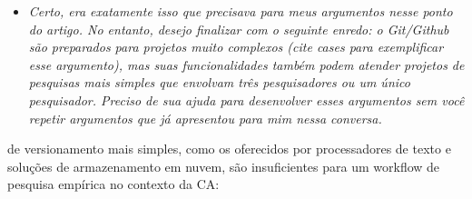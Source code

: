 \documentclass[
  a4paper,
]{article}
\providecommand{\tightlist}{%
  \setlength{\itemsep}{0pt}\setlength{\parskip}{0pt}}\usepackage{longtable,booktabs,array}
\begin{document}
{  \begin{itemize}
  \tightlist
  \item
    \emph{Certo, era exatamente isso que precisava para meus argumentos
    nesse ponto do artigo. No entanto, desejo finalizar com o seguinte
    enredo: o Git/Github são preparados para projetos muito complexos
    (cite cases para exemplificar esse argumento), mas suas
    funcionalidades também podem atender projetos de pesquisas mais
    simples que envolvam três pesquisadores ou um único pesquisador.
    Preciso de sua ajuda para desenvolver esses argumentos sem você
    repetir argumentos que já apresentou para mim nessa conversa.}
  \end{itemize}} de versionamento mais simples, como os oferecidos por
processadores de texto e soluções de armazenamento em nuvem, são
insuficientes para um workflow de pesquisa empírica no contexto da CA:
\end{document}
